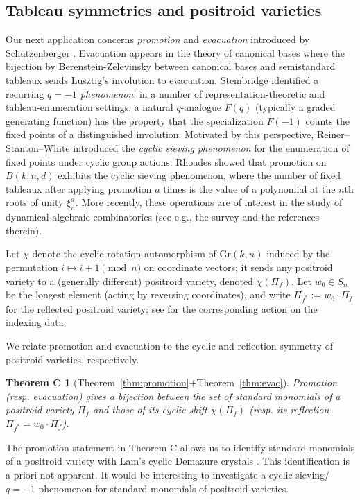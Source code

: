 \documentclass[12pt,reqno]{amsart}
\newtheorem*{thmC}{Theorem C}
\theoremstyle{definition}
\newcommand{\gr}{\mathrm{Gr}}
\begin{document}
\subsection{Tableau symmetries and positroid varieties}
Our next application concerns \emph{promotion} and \emph{evacuation} introduced by Sch\"utzenberger \cites{evacuation,promotion}. 
Evacuation appears in the theory of canonical bases where the bijection by Berenstein-Zelevinsky \cite{BZ96} between canonical bases and semistandard tableaux sends Lusztig's involution to evacuation.
Stembridge \cites{Ste94,Ste96} identified a recurring \emph{$q=-1$ phenomenon}: in a number of representation-theoretic and tableau-enumeration settings, a
natural $q$-analogue $F(q)$ (typically a graded generating function) has the property that the specialization $F(-1)$ counts the fixed points of a distinguished involution.
Motivated by this perspective, Reiner--Stanton--White \cite{RSW04} introduced the \emph{cyclic sieving phenomenon}
for the enumeration of fixed points under cyclic group actions.
Rhoades \cite{rhoades2010cyclic} showed that promotion on $B(k,n,d)$ exhibits the cyclic sieving phenomenon, where the number of fixed tableaux after applying promotion $a$ times is the value of a polynomial at the  $n$th roots of unity $\xi_n^a$.
More recently, these operations are of interest in the study of dynamical algebraic combinatorics (see e.g., the survey
\cite{Roby} and the references therein). 
 
Let $\chi$ denote the cyclic rotation automorphism of $\gr(k,n)$ induced by the permutation $i\mapsto i+1\pmod n$ on coordinate vectors; it sends any positroid variety to a (generally different) positroid variety, denoted $\chi(\Pi_f)$.
Let $w_0\in S_n$ be the longest element (acting by reversing coordinates), and write $\Pi_{f^*}:=w_0\cdot \Pi_f$ for the reflected positroid variety; see  for the corresponding action on the indexing data.

We relate promotion and evacuation to the cyclic and reflection symmetry of positroid varieties, respectively. 
 
\begin{thmC}[Theorem~\ref{thm:promotion}$+$Theorem~\ref{thm:evac}]

    Promotion (resp. evacuation) gives a bijection between the set of standard monomials of a positroid variety $\Pi_f$ and those of its cyclic shift $\chi(\Pi_f)$ (resp. its reflection $\Pi_{f^*}=w_0\cdot \Pi_f$).
\end{thmC}
The promotion statement in Theorem C allows us to identify standard monomials of a positroid variety with Lam's cyclic Demazure crystals \cite{Lam19}. This identification is a priori not apparent. It would be interesting to investigate a cyclic sieving/$q=-1$ phenomenon for standard monomials of positroid varieties.
\end{document}
